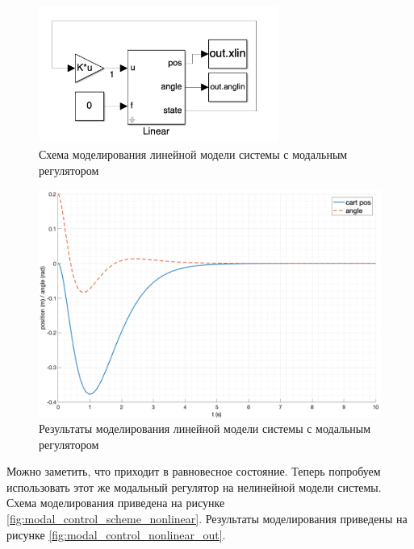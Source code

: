 \begin{figure}[ht!]
    \centering
    \includegraphics[width=0.7\textwidth]{media/modal_control_linear_scheme.png}
    \caption{Схема моделирования линейной модели системы с модальным регулятором}
    \label{fig:modal_control_scheme_linear}
\end{figure}
\begin{figure}[ht!]
    \centering
    \includegraphics[width=\textwidth]{media/plots/modal_control/modal_control_linear_out.png}
    \caption{Результаты моделирования линейной модели системы с модальным регулятором}
    \label{fig:modal_control_linear_out}
\end{figure}

Можно заметить, что приходит в равновесное состояние. Теперь попробуем использовать этот же 
модальный регулятор на нелинейной модели системы. Схема моделирования приведена на
рисунке \ref{fig:modal_control_scheme_nonlinear}. Результаты моделирования приведены на
рисунке \ref{fig:modal_control_nonlinear_out}.


